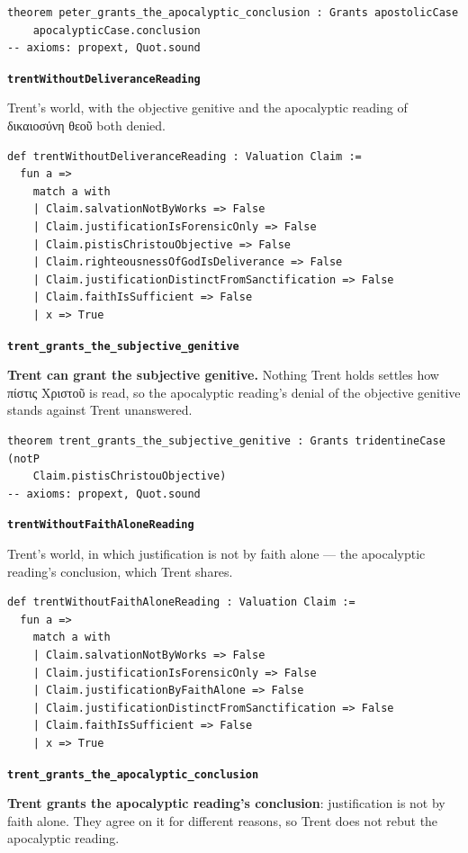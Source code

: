 \documentclass[11pt]{article}
\begin{document}
{\small\begin{verbatim}
theorem peter_grants_the_apocalyptic_conclusion : Grants apostolicCase
    apocalypticCase.conclusion
-- axioms: propext, Quot.sound
\end{verbatim}}
\par\medskip\noindent\textbf{\texttt{trent\allowbreak{}Without\allowbreak{}Deliverance\allowbreak{}Reading}}\par\nobreak\noindent
Trent's world, with the objective genitive and the apocalyptic reading of δικαιοσύνη θεοῦ both denied.

{\small\begin{verbatim}
def trentWithoutDeliveranceReading : Valuation Claim :=
  fun a =>
    match a with
    | Claim.salvationNotByWorks => False
    | Claim.justificationIsForensicOnly => False
    | Claim.pistisChristouObjective => False
    | Claim.righteousnessOfGodIsDeliverance => False
    | Claim.justificationDistinctFromSanctification => False
    | Claim.faithIsSufficient => False
    | x => True
\end{verbatim}}
\par\medskip\noindent\textbf{\texttt{trent\_\allowbreak{}grants\_\allowbreak{}the\_\allowbreak{}subjective\_\allowbreak{}genitive}}\par\nobreak\noindent
\textbf{Trent can grant the subjective genitive.} Nothing Trent holds settles how πίστις Χριστοῦ is read, so the apocalyptic reading's denial of the objective genitive stands against Trent unanswered.

{\small\begin{verbatim}
theorem trent_grants_the_subjective_genitive : Grants tridentineCase (notP
    Claim.pistisChristouObjective)
-- axioms: propext, Quot.sound
\end{verbatim}}
\par\medskip\noindent\textbf{\texttt{trent\allowbreak{}Without\allowbreak{}Faith\allowbreak{}Alone\allowbreak{}Reading}}\par\nobreak\noindent
Trent's world, in which justification is not by faith alone — the apocalyptic reading's conclusion, which Trent shares.

{\small\begin{verbatim}
def trentWithoutFaithAloneReading : Valuation Claim :=
  fun a =>
    match a with
    | Claim.salvationNotByWorks => False
    | Claim.justificationIsForensicOnly => False
    | Claim.justificationByFaithAlone => False
    | Claim.justificationDistinctFromSanctification => False
    | Claim.faithIsSufficient => False
    | x => True
\end{verbatim}}
\par\medskip\noindent\textbf{\texttt{trent\_\allowbreak{}grants\_\allowbreak{}the\_\allowbreak{}apocalyptic\_\allowbreak{}conclusion}}\par\nobreak\noindent
\textbf{Trent grants the apocalyptic reading's conclusion}: justification is not by faith alone. They agree on it for different reasons, so Trent does not rebut the apocalyptic reading.
\end{document}
